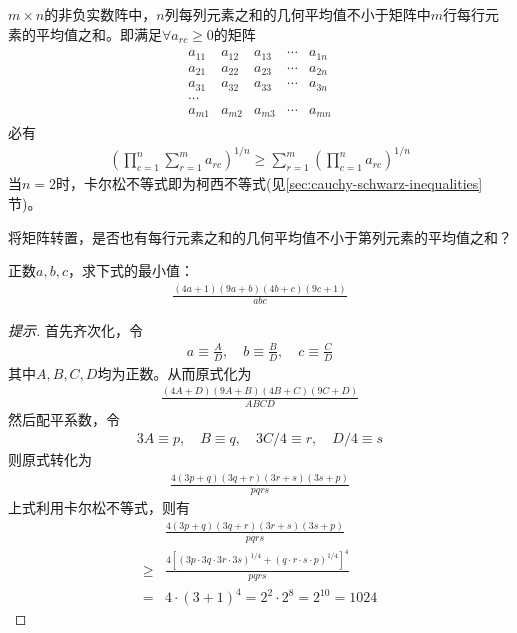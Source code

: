 \begin{theorem}
  $m\times n$的非负实数阵中，$n$列每列元素之和的几何平均值不小于矩阵中$m$行每行元素的平均值之和。即满足$\forall a_{rc}\ge 0$的矩阵
  \begin{align*}
    \begin{matrix}
      a_{11} & a_{12} & a_{13} & \cdots & a_{1n}\\
      a_{21} & a_{22} & a_{23} & \cdots & a_{2n}\\
      a_{31} & a_{32} & a_{33} & \cdots & a_{3n}\\
      \cdots\\
      a_{m1} & a_{m2} & a_{m3} & \cdots & a_{mn}
    \end{matrix}
  \end{align*}
  必有
  \begin{align}
    \left (\prod_{c=1}^n \sum_{r=1}^m a_{rc} \right) ^{1/n}  \ge
    \sum_{r=1}^m \left( \prod_{c=1}^n a_{rc} \right)^{1/n}
  \end{align}
  当$n=2$时，卡尔松不等式即为柯西不等式(见\ref{sec:cauchy-schwarz-inequalities}节)。
\end{theorem}

\begin{question}
  将矩阵转置，是否也有每行元素之和的几何平均值不小于第列元素的平均值之和？
\end{question}


\begin{example}
  正数$a,b,c$，求下式的最小值：
  \begin{align*}
    \frac{ (4a+1)(9a+b)(4b+c)(9c+1) }{abc}
  \end{align*}
\end{example}
\begin{proof}[提示]
  首先齐次化，令
  \begin{align*}
    a\equiv \frac AD,\quad b\equiv\frac BD,\quad c\equiv\frac CD
  \end{align*}
  其中$A,B,C,D$均为正数。从而原式化为
  \begin{align*}
    \frac{ (4A+D)(9A+B)(4B+C)(9C+D) }{ ABCD }
  \end{align*}
  然后配平系数，令
  \begin{align*}
    3A\equiv p,\quad B\equiv q,\quad 3C/4\equiv r,\quad D/4\equiv s
  \end{align*}
  则原式转化为
  \begin{align*}
    \frac{ 4 (3p+q)(3q+r)(3r+s)(3s+p) }{pqrs}
  \end{align*}
  上式利用卡尔松不等式，则有
  \begin{align*}
    &\frac{ 4 (3p+q)(3q+r)(3r+s)(3s+p) }{pqrs}\\
    \ge &
    \frac{ 4 \left[ (3p \cdot 3q \cdot 3r \cdot 3s)^{1/4} +
    (q \cdot r \cdot s \cdot p)^{1/4} \right]^4 } {pqrs} \\
    =& 4 \cdot (3+1)^4=2^2 \cdot 2^8 = 2^{10} = 1024
  \end{align*}
  
\end{proof}